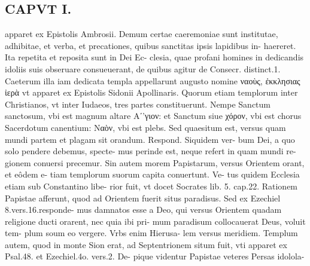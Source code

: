 \documentclass{article}
\begin{document}
\begin{pages}
\section*{CAPVT  I. }
\marginpar{[ p.73 ]}\pstart apparet ex Epistolis Ambrosii. Demum certae caeremoniae sunt institutae, adhibitae, et verba, et precationes, quibus sanctitas ipsis lapidibus in- haereret. Ita repetita et reposita sunt in Dei Ec- clesia, quae profani homines in dedicandis idoliis suis obseruare consueuerant, de quibus agitur de Consecr. distinct.1. Caeterum illa iam dedicata templa appellarunt augusto nomine ναοὺς, ἐκκλησιας ἰερὰ vt apparet ex Epistolis Sidonii Apollinaris. Quorum etiam templorum inter Christianos, vt inter Iudaeos, tres partes constituerunt. Nempe Sanctum sanctosum, vbi est magnum altare Aʹ'γιον: et Sanctum siue χόρον, vbi est chorus Sacerdotum canentium: Ναὸν, vbi est plebs. Sed quaesitum est, versus quam mundi partem et plagam sit orandum. Respond. Siquidem ver- bum Dei, a quo solo pendere debemus, specte- mus perinde est, neque refert in quam mundi re- gionem conuersi precemur. Sin autem morem Papistarum, versus Orientem orant, et eôdem e- tiam templorum suorum capita conuertunt. Ve- tus quidem Ecclesia etiam sub Constantino libe- rior fuit, vt docet Socrates lib.  5. cap.22. Rationem Papistae afferunt, quod ad Orientem fuerit situs paradisus. Sed ex Ezechiel 8.vers.16.responde- mus damnatos esse a Deo, qui versus Orientem quadam religione ducti orarent, nec quia ibi pri- mum paradisum collocauerat Deus, voluit tem- plum soum eo vergere. Vrbs enim Hierusa- lem versus meridiem. Templum autem, quod in monte Sion erat, ad Septentrionem situm fuit, vti apparet ex Psal.48. et Ezechiel.4o. vers.2. De- pique videntur Papistae veteres Persas idolola-  \pend

\end{pages}
\end{document}
